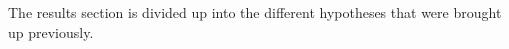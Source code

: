\documentclass[12pt]{article}
\begin{document}
The results section is divided up into the different hypotheses that were brought up previously.


 

\end{document}

